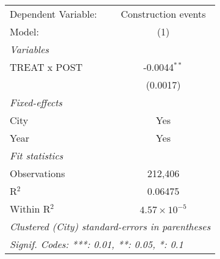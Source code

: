 \begingroup
\centering
\begin{tabular}{lc}
   \tabularnewline \midrule \midrule
   Dependent Variable: & Construction events\\  
   Model:              & (1)\\  
   \midrule
   \emph{Variables}\\
   TREAT x POST        & -0.0044$^{**}$\\   
                       & (0.0017)\\   
   \midrule
   \emph{Fixed-effects}\\
   City                & Yes\\  
   Year                & Yes\\  
   \midrule
   \emph{Fit statistics}\\
   Observations        & 212,406\\  
   R$^2$               & 0.06475\\  
   Within R$^2$        & $4.57\times 10^{-5}$\\   
   \midrule \midrule
   \multicolumn{2}{l}{\emph{Clustered (City) standard-errors in parentheses}}\\
   \multicolumn{2}{l}{\emph{Signif. Codes: ***: 0.01, **: 0.05, *: 0.1}}\\
\end{tabular}
\par\endgroup
